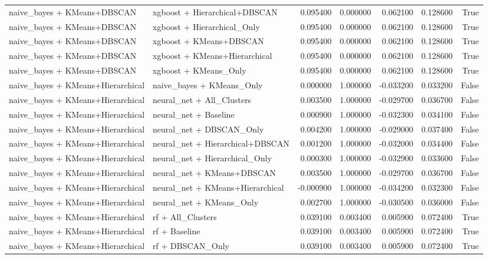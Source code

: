 \begin{tabular}{llrrrrr}
naive_bayes + KMeans+DBSCAN & xgboost + Hierarchical+DBSCAN & 0.095400 & 0.000000 & 0.062100 & 0.128600 & True \\
naive_bayes + KMeans+DBSCAN & xgboost + Hierarchical_Only & 0.095400 & 0.000000 & 0.062100 & 0.128600 & True \\
naive_bayes + KMeans+DBSCAN & xgboost + KMeans+DBSCAN & 0.095400 & 0.000000 & 0.062100 & 0.128600 & True \\
naive_bayes + KMeans+DBSCAN & xgboost + KMeans+Hierarchical & 0.095400 & 0.000000 & 0.062100 & 0.128600 & True \\
naive_bayes + KMeans+DBSCAN & xgboost + KMeans_Only & 0.095400 & 0.000000 & 0.062100 & 0.128600 & True \\
naive_bayes + KMeans+Hierarchical & naive_bayes + KMeans_Only & 0.000000 & 1.000000 & -0.033200 & 0.033200 & False \\
naive_bayes + KMeans+Hierarchical & neural_net + All_Clusters & 0.003500 & 1.000000 & -0.029700 & 0.036700 & False \\
naive_bayes + KMeans+Hierarchical & neural_net + Baseline & 0.000900 & 1.000000 & -0.032300 & 0.034100 & False \\
naive_bayes + KMeans+Hierarchical & neural_net + DBSCAN_Only & 0.004200 & 1.000000 & -0.029000 & 0.037400 & False \\
naive_bayes + KMeans+Hierarchical & neural_net + Hierarchical+DBSCAN & 0.001200 & 1.000000 & -0.032000 & 0.034400 & False \\
naive_bayes + KMeans+Hierarchical & neural_net + Hierarchical_Only & 0.000300 & 1.000000 & -0.032900 & 0.033600 & False \\
naive_bayes + KMeans+Hierarchical & neural_net + KMeans+DBSCAN & 0.003500 & 1.000000 & -0.029700 & 0.036700 & False \\
naive_bayes + KMeans+Hierarchical & neural_net + KMeans+Hierarchical & -0.000900 & 1.000000 & -0.034200 & 0.032300 & False \\
naive_bayes + KMeans+Hierarchical & neural_net + KMeans_Only & 0.002700 & 1.000000 & -0.030500 & 0.036000 & False \\
naive_bayes + KMeans+Hierarchical & rf + All_Clusters & 0.039100 & 0.003400 & 0.005900 & 0.072400 & True \\
naive_bayes + KMeans+Hierarchical & rf + Baseline & 0.039100 & 0.003400 & 0.005900 & 0.072400 & True \\
naive_bayes + KMeans+Hierarchical & rf + DBSCAN_Only & 0.039100 & 0.003400 & 0.005900 & 0.072400 & True \\

\end{tabular}
